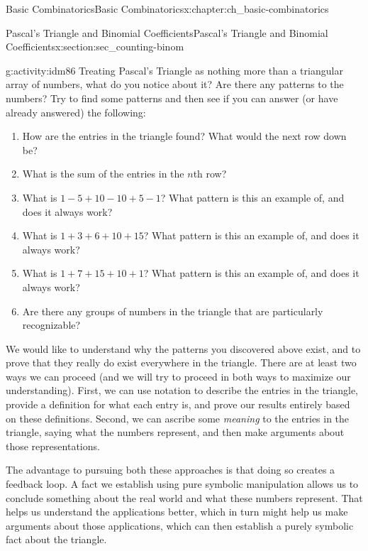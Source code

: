 \documentclass[oneside,10pt,]{book}
\numberwithin{equation}{chapter}
\begin{document}
\begin{chapterptx}{Basic Combinatorics}{}{Basic Combinatorics}{}{}{x:chapter:ch_basic-combinatorics}
\begin{sectionptx}{Pascal's Triangle and Binomial Coefficients}{}{Pascal's Triangle and Binomial Coefficients}{}{}{x:section:sec_counting-binom}
\begin{sidebyside}{1}{0}{0}{0}
\begin{sbspanel}{1}
{\begin{tikzpicture}
\end{tikzpicture}
}%
\end{sbspanel}%
\end{sidebyside}%
\begin{activity}{}{g:activity:idm86}%
Treating Pascal's Triangle as nothing more than a triangular array of numbers, what do you notice about it?  Are there any patterns to the numbers? Try to find some patterns and then see if you can answer (or have already answered) the following:%
\begin{enumerate}[font=\bfseries,label=(\alph*),ref=\alph*]
\item{}How are the entries in the triangle found?  What would the next row down be?%
\item{}What is the sum of the entries in the \(n\)th row?%
\item{}What is \(1 - 5 + 10 - 10 + 5 - 1\)?  What pattern is this an example of, and does it always work?%
\item{}What is \(1 + 3 + 6 + 10 + 15\)?  What pattern is this an example of, and does it always work?%
\item{}What is \(1+ 7 + 15 + 10 + 1\)?  What pattern is this an example of, and does it always work?%
\item{}Are there any groups of numbers in the triangle that are particularly recognizable?%
\end{enumerate}
\end{activity}
We would like to understand why the patterns you discovered above exist, and to prove that they really do exist everywhere in the triangle.  There are at least two ways we can proceed (and we will try to proceed in both ways to maximize our understanding).  First, we can use notation to describe the entries in the triangle, provide a definition for what each entry is, and prove our results entirely based on these definitions.  Second, we can ascribe some \emph{meaning} to the entries in the triangle, saying what the numbers represent, and then make arguments about those representations.%
\par
 The advantage to pursuing both these approaches is that doing so creates a feedback loop.  A fact we establish using pure symbolic manipulation allows us to conclude something about the real world and what these numbers represent.  That helps us understand the applications better, which in turn might help us make arguments about those applications, which can then establish a purely symbolic fact about the triangle.%
\par

\end{sectionptx}
\end{chapterptx}
\end{document}
